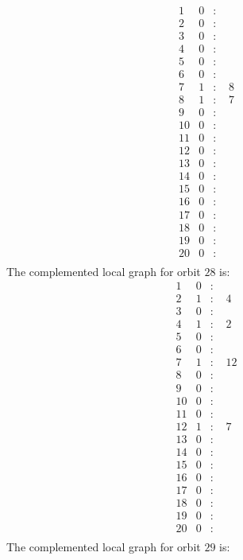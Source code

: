 \documentclass[12pt]{article}
\begin{document}
\begin{equation*}
\begin{array}{rrcl}
1&0&:&\\
2&0&:&\\
3&0&:&\\
4&0&:&\\
5&0&:&\\
6&0&:&\\
7&1&:&\,\,8\\
8&1&:&\,\,7\\
9&0&:&\\
10&0&:&\\
11&0&:&\\
12&0&:&\\
13&0&:&\\
14&0&:&\\
15&0&:&\\
16&0&:&\\
17&0&:&\\
18&0&:&\\
19&0&:&\\
20&0&:&\\
\end{array}
\end{equation*}
The complemented local graph for orbit $28$ is:
\begin{equation*}
\begin{array}{rrcl}
1&0&:&\\
2&1&:&\,\,4\\
3&0&:&\\
4&1&:&\,\,2\\
5&0&:&\\
6&0&:&\\
7&1&:&\,\,12\\
8&0&:&\\
9&0&:&\\
10&0&:&\\
11&0&:&\\
12&1&:&\,\,7\\
13&0&:&\\
14&0&:&\\
15&0&:&\\
16&0&:&\\
17&0&:&\\
18&0&:&\\
19&0&:&\\
20&0&:&\\
\end{array}
\end{equation*}
The complemented local graph for orbit $29$ is:
\end{document}
